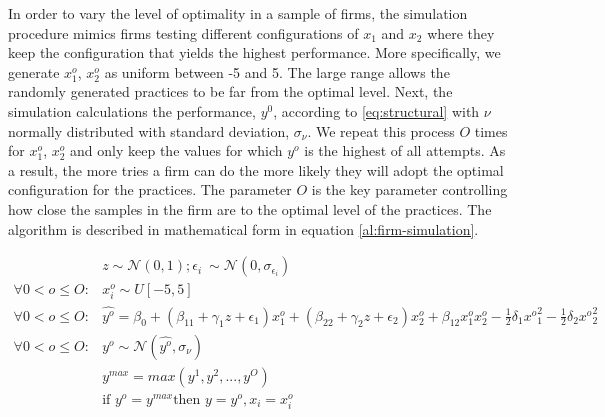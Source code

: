 \documentclass[12pt]{article}
\begin{document}
In order to vary the level of optimality in a sample of firms, the simulation procedure mimics firms testing different configurations of $x_1$ and $x_2$ where they keep the configuration that yields the highest performance. More specifically, we generate \(x^o_{1}\), \(x^o_{2}\) as uniform between -5 and 5. The large range allows the randomly generated practices to be far from the optimal level.  Next, the simulation calculations the performance, $y^0$, according to \eqref{eq:structural} with $\nu$ normally distributed with standard deviation, $\sigma_{\nu}$. We repeat this process $O$ times for \(x^o_{1}\), \(x^o_{2}\) and only keep the values for which $y^o$ is the highest of all attempts. As a result, the more tries a firm can do the more likely they will adopt the optimal configuration for the practices. The parameter $O$ is the key parameter controlling how close the samples in the firm are to the optimal level of the practices. The algorithm is described in mathematical form in equation \eqref{al:firm-simulation}. 

\begin{equation}\label{al:firm-simulation}
\begin{aligned}
	&z \sim \mathcal{N}(0, 1); \epsilon_i ~ \sim \mathcal{N}(0, \sigma_{\epsilon_i}) \\
    \forall 0 < o \leq O: &x^o_i \sim U[-5,5] \\
    \forall 0 < o \leq O: &\hat{y^o} = \beta_0 + (\beta_{11} + \gamma_1 z + \epsilon_1) x^o_1 
						+ (\beta_{22} + \gamma_2 z  + \epsilon_2) x^o_2 
                        + \beta_{12} x^o_1 x^o_2 - \frac{1}{2}\delta_1 {x^o}^2_1 - \frac{1}{2}\delta_2 {x^o}^2_2 \\
     \forall 0 < o \leq O: &y^o \sim \mathcal{N}(\hat{y^o}, \sigma_{\nu}) \\
	 &y^{max} = max(y^1, y^2, ..., y^O)  \\
     &\text{if } y^o = y^{max} \text{then } y = y^o, x_i = x^o_i
\end{aligned}
\end{equation}
\end{document}
